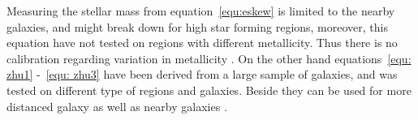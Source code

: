 Measuring the stellar mass from equation~\ref{equ:eskew} is limited to the nearby galaxies, and might break down for high star forming regions, moreover, this equation have not tested on regions with different metallicity. Thus there is no calibration regarding variation in  metallicity \citep{Eskew12}. On the other hand equations~\ref{equ: zhu1} -~\ref{equ: zhu3} have been derived from a large sample of galaxies, and was tested on different type of regions and galaxies. Beside they can be used for more distanced galaxy as well as nearby galaxies \citep{Zhu10}. 






